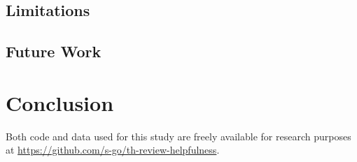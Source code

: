 \documentclass[
    a4paper,%
    12pt,%
    oneside,%
    toc=bibliography,
    final,
]{scrartcl}
\begin{document}
\subsection{Limitations}



\subsection{Future Work}



\section{Conclusion}
\label{sec:conclusion}



\vfill


\begin{center}
Both code and data used for this study are freely available for research purposes at \url{https://github.com/s-go/th-review-helpfulness}.
\end{center}

\newpage
\begin{thebibliography}{9}



\end{thebibliography}
\end{document}
